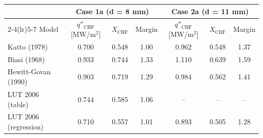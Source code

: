 \begin{tabular}{lcccccc}
\toprule
 & \multicolumn{3}{c}{Case 1a (d = 8 mm)} & \multicolumn{3}{c}{Case 2a (d = 11 mm)} \\
\cmidrule(lr){2-4}\cmidrule(lr){5-7}
Model & $q''_\mathrm{CHF}$ [MW/m$^2$] & $X_\mathrm{CHF}$ & Margin & $q''_\mathrm{CHF}$ [MW/m$^2$] & $X_\mathrm{CHF}$ & Margin \\
\midrule
Katto (1978) & 0.700 & 0.548 & 1.00 & 0.962 & 0.548 & 1.37 \\
Biasi (1968) & 0.933 & 0.744 & 1.33 & 1.110 & 0.639 & 1.59 \\
Hewitt-Govan (1990) & 0.903 & 0.719 & 1.29 & 0.984 & 0.562 & 1.41 \\
LUT 2006 (table) & 0.744 & 0.585 & 1.06 & -- & -- & -- \\
LUT 2006 (regression) & 0.710 & 0.557 & 1.01 & 0.893 & 0.505 & 1.28 \\
\bottomrule
\end{tabular}
